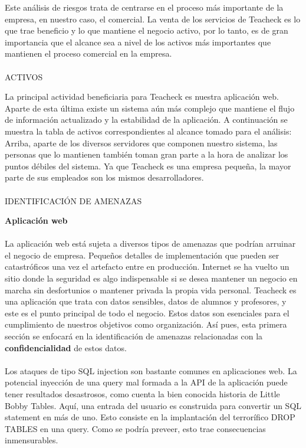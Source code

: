 Este análisis de riesgos trata de centrarse en el proceso más importante de la empresa, en nuestro caso, el comercial. La venta de los servicios de Teacheck es lo que trae beneficio y lo que mantiene el negocio activo, por lo tanto, es de gran importancia que el alcance sea a nivel de los activos más importantes que mantienen el proceso comercial en la empresa.

\paragraph{}
ACTIVOS

La principal actividad beneficiaria para Teacheck es nuestra aplicación web. Aparte de esta última existe un sistema aún más complejo que mantiene el flujo de información actualizado y la estabilidad de la aplicación. A continuación se muestra la tabla de activos correspondientes al alcance tomado para el análisis:
Arriba, aparte de los diversos servidores que componen nuestro sistema, las personas que lo mantienen también toman gran parte a la hora de analizar los puntos débiles del sistema. Ya que Teacheck es una empresa pequeña, la mayor parte de sus empleados son los mismos desarrolladores.

\paragraph{}
IDENTIFICACIÓN DE AMENAZAS

\textbf{Aplicación web}
\paragraph{}
La aplicación web está sujeta a diversos tipos de amenazas que podrían arruinar el negocio de empresa. Pequeños detalles de implementación que pueden ser catastróficos una vez el artefacto entre en producción. Internet se ha vuelto un sitio donde la seguridad es algo indispensable si se desea mantener un negocio en marcha sin desfortunios o mantener privada la propia vida personal. Teacheck es una aplicación que trata con datos sensibles, datos de alumnos y profesores, y este es el punto principal de todo el negocio. Estos datos son esenciales para el cumplimiento de nuestros objetivos como organización. Así pues, esta primera sección se enfocará en la identificación de amenazas relacionadas con la \textbf{confidencialidad} de estos datos.
\paragraph{}
Los ataques de tipo SQL injection son bastante comunes en aplicaciones web. La potencial inyección de una query mal formada a la API de la aplicación puede tener resultados desastrosos, como cuenta la bien conocida historia de Little Bobby Tables. Aquí, una entrada del usuario es construida para convertir un SQL statement en más de uno. Esto consiste en la implantación del terrorífico DROP TABLES  en una query. Como se podría preveer, esto trae consecuencias inmensurables. 
